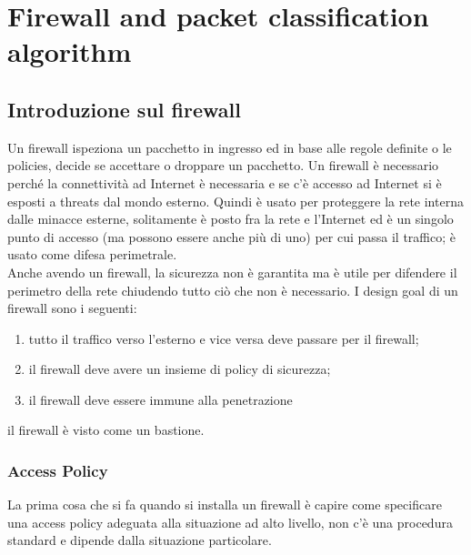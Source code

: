 \documentclass[12pt, oneside]{extbook} %
\begin{document}
\chapter{Firewall and packet classification algorithm}
\section{Introduzione sul firewall}
Un firewall ispeziona un pacchetto in ingresso ed in base alle regole definite o le policies, decide se accettare o droppare un pacchetto. Un firewall è necessario perché la connettività ad Internet è necessaria e se c'è accesso ad Internet si è esposti a threats dal mondo esterno. Quindi è usato per proteggere la rete interna dalle minacce esterne, solitamente è posto fra la rete e l'Internet ed è un singolo punto di accesso (ma possono essere anche più di uno) per cui passa il traffico; è usato come difesa perimetrale.\\ Anche avendo un firewall, la sicurezza non è garantita ma è utile per difendere il perimetro della rete chiudendo tutto ciò che non è necessario. I design goal di un firewall sono i seguenti:
\begin{enumerate}
\item tutto il traffico verso l'esterno e vice versa deve passare per il firewall;
\item il firewall deve avere un insieme di policy di sicurezza;
\item il firewall deve essere immune alla penetrazione
\end{enumerate}
il firewall è visto come un bastione. 
\subsection{Access Policy}
La prima cosa che si fa quando si installa un firewall è capire come specificare una access policy adeguata alla situazione ad alto livello, non c'è una procedura standard e dipende dalla situazione particolare.
\end{document}
